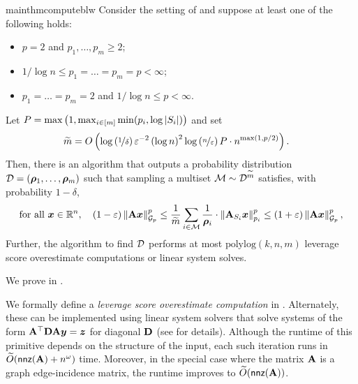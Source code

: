 \documentclass[11pt]{article}
\numberwithin{equation}{section}
\begin{document}
\begin{restatable}{mainthm}{computeblw}
\label{thm:computeblw}
Consider the setting of  and suppose at least one of the following holds:
\begin{itemize}
    \item $p = 2$ and $p_1,\dots,p_m \ge 2$;
    \item $1/\log n \le p_1=\dots=p_m=p < \infty$;
    \item $p_1 = \dots = p_m = 2$ and $1/\log n \le p < \infty$.
\end{itemize}
Let $P = \max\left(1, \max_{i \in [m]} \min(p_i,\log\left\lvert S_i \right\rvert)\right)$ and set
\begin{align*}
    \widetilde{m} &= O\left(\log\left(\nicefrac{1}{\delta}\right)\varepsilon^{-2}\left(\log n\right)^2\log\left(\nicefrac{n}{\varepsilon}\right) P \cdot n^{\max(1,p/2)}\right).
\end{align*}
Then, there is an algorithm that outputs a probability distribution $\mathcal{D} = (\bm{\rho}_1,\dots,\bm{\rho}_m)$ such that sampling a multiset $\mathcal{M} \sim \mathcal{D}^{\widetilde{m}}$ satisfies, with probability \(1 - \delta\),
\begin{align*}
    \text{for all } \bm{x} \in \mathbb{R}^n,\quad (1-\varepsilon)\left\lVert \mathbf{A}\bm{x} \right\rVert_{\mathcal{G}_{p}}^p \le \frac{1}{\widetilde{m}}\sum_{i \in \mathcal{M}} \frac{1}{\bm{\rho}_i} \cdot \left\lVert \mathbf{A}_{S_i}\bm{x} \right\rVert_{p_i}^p \le (1+\varepsilon)\left\lVert \mathbf{A}\bm{x} \right\rVert_{\mathcal{G}_{p}}^p,
\end{align*}
Further, the algorithm to find $\mathcal{D}$ performs at most \(\text{polylog}(k,n,m)\) leverage score overestimate computations or linear system solves.
\end{restatable}

We prove  in .

We formally define a \textit{leverage score overestimate computation} in . Alternately, these can be implemented using linear system solvers that solve systems of the form $\mathbf{A}^{\top}\mathbf{D}\mathbf{A}\bm{y}=\bm{z}$ for diagonal $\mathbf{D}$ (see \cite{ls19} for details). Although the runtime of this primitive depends on the structure of the input, each such iteration runs in $\widetilde{O}(\mathsf{nnz}(\mathbf{A}) + n^{\omega})$ time. Moreover, in the special case where the matrix $\mathbf{A}$ is a graph edge-incidence matrix, the runtime improves to $\widetilde{O}(\mathsf{nnz}(\mathbf{A}))$.

\end{document}
